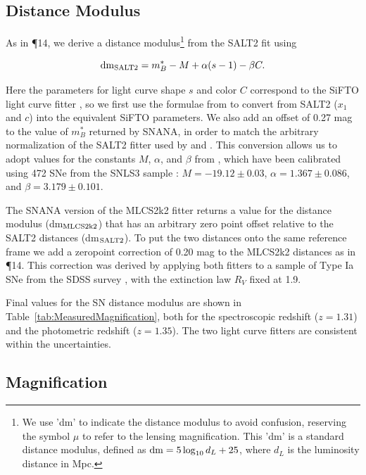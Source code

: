 \subsection{Distance Modulus}
\label{sec:DistanceModulus}

As in \P14, we derive a distance modulus\footnote{We use 'dm' to
indicate the distance modulus to avoid confusion, reserving the symbol
$\mu$ to refer to the lensing magnification. This 'dm' is a standard
distance modulus, defined as ${\rm dm}=5\log_{10}d_L+25$, where $d_L$
is the luminosity distance in Mpc.}  from the SALT2 fit using

\begin{equation} \label{eqn:dmSALT2}
 {\rm dm}_{\rm SALT2} = m_B^* - M + \alpha(s-1) - \beta C.
\end{equation}

\noindent  Here the parameters for light curve shape $s$ and color $C$ 
correspond to the SiFTO light curve fitter \citep{Conley:2008}, so we
first use the formulae from \citet{Guy:2010} to convert from SALT2
($x_1$ and $c$) into the equivalent SiFTO parameters.  We also add an
offset of 0.27 mag to the value of $m_B^*$ returned by SNANA, in order
to match the arbitrary normalization of the SALT2 fitter used
by \citet{Guy:2010} and \citet{Sullivan:2011}.  This conversion allows
us to adopt values for the constants $M$, $\alpha$, and $\beta$
from \citet{Sullivan:2011}, which have been calibrated using 472 SNe
from the SNLS3 sample \citep{Conley:2011}: $M=-19.12\pm0.03$,
$\alpha=1.367\pm0.086$, and $\beta=3.179\pm0.101$.



The SNANA version of the MLCS2k2 fitter returns a value for the
distance modulus (dm$_{\rm MLCS2k2}$) that has an arbitrary zero point
offset relative to the SALT2 distances (dm$_{\rm SALT2}$).  To put the
two distances onto the same reference frame we add a zeropoint
correction of 0.20 mag to the MLCS2k2 distances as
in \P14.  This correction was derived by applying both
fitters to a sample of Type Ia SNe from the SDSS
survey \citep{Holtzman:2008,Kessler:2009b}, with the extinction law
$R_V$ fixed at 1.9.

Final values for the SN distance modulus are shown in
Table~\ref{tab:MeasuredMagnification}, both for the spectroscopic
redshift ($z=1.31$) and the photometric redshift ($z=1.35$).  The two
light curve fitters are consistent within the uncertainties. 


\subsection{Magnification}
\label{sec:Magnification}

